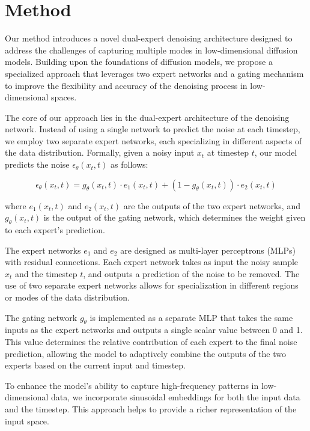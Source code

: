 \documentclass{article} %
\begin{document}
\section{Method}
\label{sec:method}

Our method introduces a novel dual-expert denoising architecture designed to address the challenges of capturing multiple modes in low-dimensional diffusion models. Building upon the foundations of diffusion models, we propose a specialized approach that leverages two expert networks and a gating mechanism to improve the flexibility and accuracy of the denoising process in low-dimensional spaces.

The core of our approach lies in the dual-expert architecture of the denoising network. Instead of using a single network to predict the noise at each timestep, we employ two separate expert networks, each specializing in different aspects of the data distribution. Formally, given a noisy input $x_t$ at timestep $t$, our model predicts the noise $\epsilon_\theta(x_t, t)$ as follows:

\begin{equation}
    \epsilon_\theta(x_t, t) = g_\theta(x_t, t) \cdot e_1(x_t, t) + (1 - g_\theta(x_t, t)) \cdot e_2(x_t, t)
\end{equation}

where $e_1(x_t, t)$ and $e_2(x_t, t)$ are the outputs of the two expert networks, and $g_\theta(x_t, t)$ is the output of the gating network, which determines the weight given to each expert's prediction.

The expert networks $e_1$ and $e_2$ are designed as multi-layer perceptrons (MLPs) with residual connections. Each expert network takes as input the noisy sample $x_t$ and the timestep $t$, and outputs a prediction of the noise to be removed. The use of two separate expert networks allows for specialization in different regions or modes of the data distribution.

The gating network $g_\theta$ is implemented as a separate MLP that takes the same inputs as the expert networks and outputs a single scalar value between 0 and 1. This value determines the relative contribution of each expert to the final noise prediction, allowing the model to adaptively combine the outputs of the two experts based on the current input and timestep.

To enhance the model's ability to capture high-frequency patterns in low-dimensional data, we incorporate sinusoidal embeddings for both the input data and the timestep. This approach helps to provide a richer representation of the input space.
\end{document}
